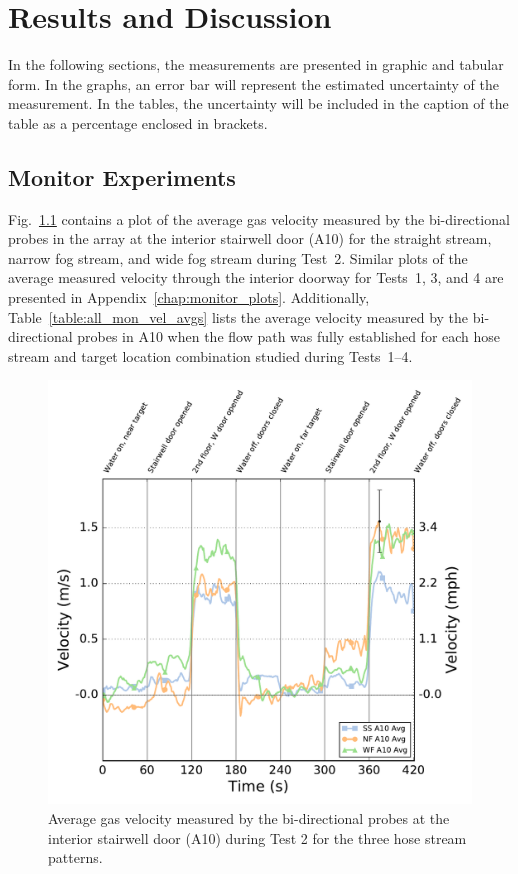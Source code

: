 \documentclass[12pt,oneside]{book}
\begin{document}

\chapter{Results and Discussion}
\label{chap:results}
In the following sections, the measurements are presented in graphic and tabular form. In the graphs, an error bar will represent the estimated uncertainty of the measurement. In the tables, the uncertainty will be included in the caption of the table as a percentage enclosed in brackets.

\section{Monitor Experiments}
\label{sec:monitor_results}
Fig.~\ref{fig:Test_2_BDP_A10_Avg_All} contains a plot of the average gas velocity measured by the bi-directional probes in the array at the interior stairwell door (A10) for the straight stream, narrow fog stream, and wide fog stream during Test~2. Similar plots of the average measured velocity through the interior doorway for Tests~1, 3, and 4 are presented in Appendix~\ref{chap:monitor_plots}. Additionally, Table~\ref{table:all_mon_vel_avgs} lists the average velocity measured by the bi-directional probes in A10 when the flow path was fully established for each hose stream and target location combination studied during Tests~1--4.

\begin{figure}[!ht]
	\includegraphics[width=\columnwidth]{../Figures/Plots/Test_16_West_063014_BDP_A10_stream_avgs}
	\caption[Average gas velocity through the interior stairwell door during Test 2 for the three hose stream patterns.]{Average gas velocity measured by the bi-directional probes at the interior stairwell door (A10) during Test 2 for the three hose stream patterns.}
	\label{fig:Test_2_BDP_A10_Avg_All}
\end{figure}
\end{document}
